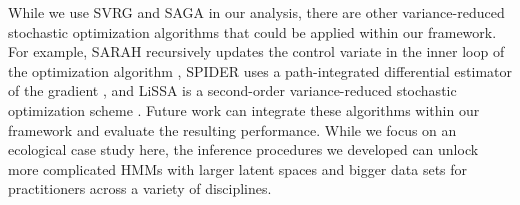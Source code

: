 %
%

While we use SVRG and SAGA in our analysis, there are other variance-reduced stochastic optimization algorithms that could be applied within our framework. For example, SARAH recursively updates the control variate in the inner loop of the optimization algorithm \citep{Nguyen:2017}, SPIDER uses a path-integrated differential estimator of the gradient \citep{Fang:2018}, and LiSSA is a second-order variance-reduced stochastic optimization scheme \citep{Agarwal:2017}. Future work can integrate these algorithms within our framework and evaluate the resulting performance. 
While we focus on an ecological case study here, the inference procedures we developed can unlock more complicated HMMs with larger latent spaces and bigger data sets for practitioners across a variety of disciplines.